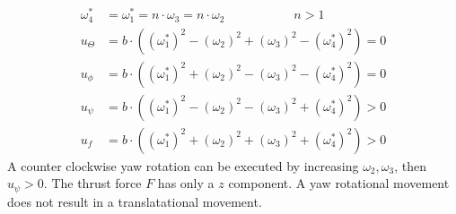 \begin{align*}
	\omega_4^* &= \omega_1^* = n \cdot \omega_3 = n \cdot \omega_2 \qquad \qquad \quad \enspace  n > 1\\
	u_{\Theta} &= b \cdot ((\omega_1^*)^2 - (\omega_2)^2 + (\omega_3)^2 - (\omega_4^*)^2) = 0\\
	u_{\phi} &= b \cdot ((\omega_1^*)^2 + (\omega_2)^2 - (\omega_3)^2 - (\omega_4^*)^2) = 0 \\
	u_{\psi} &= b \cdot ((\omega_1^*)^2 - (\omega_2)^2 - (\omega_3)^2 + (\omega_4^*)^2)	> 0 \\
	u_f &= b \cdot ((\omega_1^*)^2 + (\omega_2)^2 + (\omega_3)^2 + (\omega_4^*)^2) > 0 
\end{align*}
\newline
A counter clockwise yaw rotation can be executed by increasing $\omega_2, \omega_3$, then $u_{\psi} > 0$.
The thrust force $F$ has only a $z$ component. A yaw rotational movement does not result in a translatational movement.

 \newpage
 

